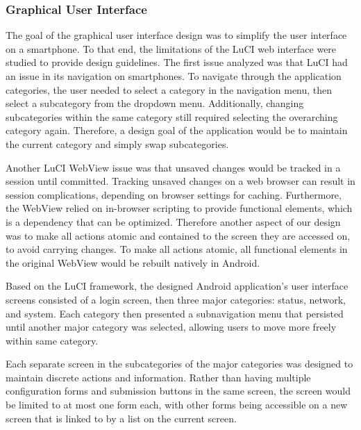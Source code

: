 \subsubsection{Graphical User Interface}
The goal of the graphical user interface design was to simplify the user interface on a smartphone. To that end, the limitations of the LuCI web interface were studied to provide design guidelines. The first issue analyzed was that LuCI had an issue in its navigation on smartphones. To navigate through the application categories, the user needed to select a category in the navigation menu, then select a subcategory from the dropdown menu. Additionally, changing subcategories within the same category still required selecting the overarching category again. Therefore, a design goal of the application would be to maintain the current category and simply swap subcategories.
	
Another LuCI WebView issue was that unsaved changes would be tracked in a session until committed. Tracking unsaved changes on a web browser can result in session complications, depending on browser settings for caching. Furthermore, the WebView relied on in-browser scripting to provide functional elements, which is a dependency that can be optimized. Therefore another aspect of our design was to make all actions atomic and contained to the screen they are accessed on, to avoid carrying changes. To make all actions atomic, all functional elements in the original WebView would be rebuilt natively in Android.
	
Based on the LuCI framework, the designed Android application's user interface screens consisted of a login screen, then three major categories: status, network, and system. Each category then presented a subnavigation menu that persisted until another major category was selected, allowing users to move more freely within same category.
	
Each separate screen in the subcategories of the major categories was designed to maintain discrete actions and information. Rather than having multiple configuration forms and submission buttons in the same screen, the screen would be limited to at most one form each, with other forms being accessible on a new screen that is linked to by a list on the current screen.
